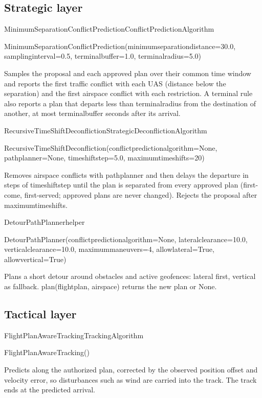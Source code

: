 \documentclass[11pt,a4paper,oneside]{report}
\newcommand{\sig}[1]{\par{\small\ttfamily\def\_{\textunderscore\allowbreak}\color{primary!85!black}#1}\par}
\newcommand{\code}[1]{\textcolor{primary!85!black}{\ttfamily\def\_{\textunderscore\allowbreak}#1}}
\begin{document}
\subsection{Strategic layer}

\begin{api}{MinimumSeparationConflictPrediction}{ConflictPredictionAlgorithm}
\sig{MinimumSeparationConflictPrediction(minimum\_separation\_distance=30.0,
sampling\_interval=0.5, terminal\_buffer=1.0, terminal\_radius=5.0)}
Samples the proposal and each approved plan over their common time window
and reports the first traffic conflict with each UAS (distance below the
separation) and the first airspace conflict with each restriction. A
terminal rule also reports a plan that departs less than
\code{terminal\_radius} from the destination of another, at most
\code{terminal\_buffer} seconds after its arrival.
\end{api}

\begin{api}{RecursiveTimeShiftDeconfliction}{StrategicDeconflictionAlgorithm}
\sig{RecursiveTimeShiftDeconfliction(conflict\_prediction\_algorithm=None,
path\_planner=None, time\_shift\_step=5.0, maximum\_time\_shifts=20)}
Removes airspace conflicts with \code{path\_planner} and then delays the
departure in steps of \code{time\_shift\_step} until the plan is separated
from every approved plan (first-come, first-served; approved plans are never
changed). Rejects the proposal after \code{maximum\_time\_shifts}.
\end{api}

\begin{api}{DetourPathPlanner}{helper}
\sig{DetourPathPlanner(conflict\_prediction\_algorithm=None,
lateral\_clearance=10.0, vertical\_clearance=10.0, maximum\_maneuvers=4,
allow\_lateral=True, allow\_vertical=True)}
Plans a short detour around obstacles and active geofences: lateral first,
vertical as fallback. \code{plan(flight\_plan, airspace)} returns the new plan
or \code{None}.
\end{api}

\subsection{Tactical layer}

\begin{api}{FlightPlanAwareTracking}{TrackingAlgorithm}
\sig{FlightPlanAwareTracking()}
Predicts along the authorized plan, corrected by the observed position
offset and velocity error, so disturbances such as wind are carried into the
track. The track ends at the predicted arrival.
\end{api}
\end{document}

